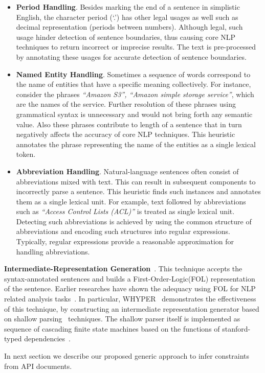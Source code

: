 \begin{itemize}

\item \textbf{Period Handling}. Besides marking the end of a sentence in simplistic English, the character period (`.') has other legal usages as well such as decimal representation (periods between numbers).
Although legal, such usage hinder detection of sentence boundaries, thus causing core NLP techniques to return incorrect or imprecise results.
The text is pre-processed by annotating these usages for accurate detection of sentence boundaries.
	
\item \textbf{Named Entity Handling}. Sometimes a sequence of words correspond to the name of entities that have a specific meaning collectively.
For instance, consider the phrases \textit{``Amazon S3'', ``Amazon simple storage service''}, which are the names of the service.
Further resolution of these phrases using grammatical syntax is unnecessary and would not bring forth any semantic value.
Also these phrases contribute to length of a sentence that in turn negatively affects the accuracy of core NLP techniques.
This heuristic annotates the phrase representing the name of the entities as a single lexical token.
	
\item \textbf{Abbreviation Handling}. Natural-language sentences often consist of abbreviations mixed with text.
This can result in subsequent components to incorrectly parse a sentence.
This heuristic finds such instances and annotates them as a single lexical unit.
For example, text followed by abbreviations such as \textit{``Access Control Lists (ACL)''} is treated as single lexical unit.
Detecting such abbreviations is achieved by using the common structure of abbreviations and encoding such structures into regular expressions.
Typically, regular expressions provide a reasonable approximation for handling abbreviations.  

\end{itemize}

\textbf{Intermediate-Representation Generation}~\cite{pandita13:WHYPER}.
This technique accepts the syntax-annotated sentences and builds a First-Order-Logic(FOL) representation of the sentence.
Earlier researches have shown the adequacy using FOL for NLP related analysis tasks~\cite{Sinha2009,Sinha2010,pandita12:inferring}.
In particular, WHYPER~\cite{pandita13:WHYPER} demonstrates the effectiveness of this technique, by constructing an intermediate representation generator based on shallow parsing~\cite{Branimir2000} techniques. 
The shallow parser itself is implemented as sequence of cascading finite state machines based on the functions of stanford-typed dependencies~\cite{Marneffe06LREC,Marneffe08COLING,Klein03,KleinNIPS03}.


In next section we describe our proposed generic approach to infer constraints from API documents. 
